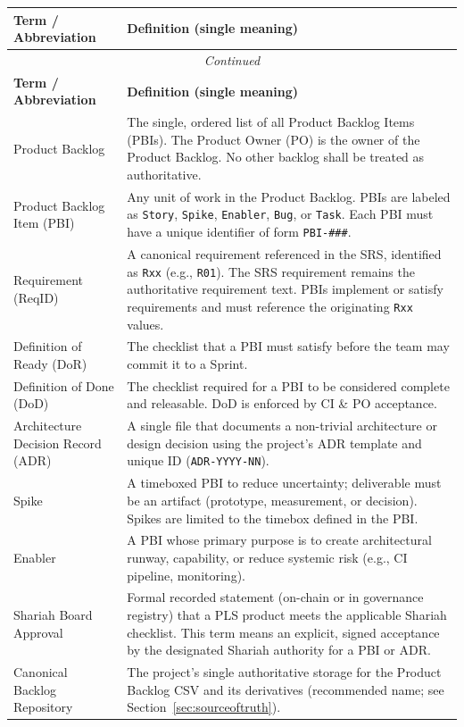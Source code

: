 \documentclass[11pt,a4paper]{article}
\begin{document}
\begin{longtable}{p{} p{}}
\toprule
\textbf{Term / Abbreviation} & \textbf{Definition (single meaning)} \\
\midrule
\endfirsthead
\multicolumn{2}{c}{\textit{Continued}}\\
\toprule
\textbf{Term / Abbreviation} & \textbf{Definition (single meaning)} \\
\midrule
\endhead
Product Backlog & The single, ordered list of all Product Backlog Items (PBIs). The Product Owner (PO) is the owner of the Product Backlog. No other backlog shall be treated as authoritative. \\
Product Backlog Item (PBI) & Any unit of work in the Product Backlog. PBIs are labeled as \texttt{Story}, \texttt{Spike}, \texttt{Enabler}, \texttt{Bug}, or \texttt{Task}. Each PBI must have a unique identifier of form \texttt{PBI-\#\#\#}. \\
Requirement (ReqID) & A canonical requirement referenced in the SRS, identified as \texttt{Rxx} (e.g., \texttt{R01}). The SRS requirement remains the authoritative requirement text. PBIs implement or satisfy requirements and must reference the originating \texttt{Rxx} values. \\
Definition of Ready (DoR) & The checklist that a PBI must satisfy before the team may commit it to a Sprint. \\
Definition of Done (DoD) & The checklist required for a PBI to be considered complete and releasable. DoD is enforced by CI \& PO acceptance. \\
Architecture Decision Record (ADR) & A single file that documents a non-trivial architecture or design decision using the project's ADR template and unique ID (\texttt{ADR-YYYY-NN}). \\
Spike & A timeboxed PBI to reduce uncertainty; deliverable must be an artifact (prototype, measurement, or decision). Spikes are limited to the timebox defined in the PBI. \\
Enabler & A PBI whose primary purpose is to create architectural runway, capability, or reduce systemic risk (e.g., CI pipeline, monitoring). \\
Shariah Board Approval & Formal recorded statement (on-chain or in governance registry) that a PLS product meets the applicable Shariah checklist. This term means an explicit, signed acceptance by the designated Shariah authority for a PBI or ADR. \\
Canonical Backlog Repository & The project's single authoritative storage for the Product Backlog CSV and its derivatives (recommended name; see Section~\ref{sec:sourceoftruth}). \\

\end{longtable}
\end{document}

